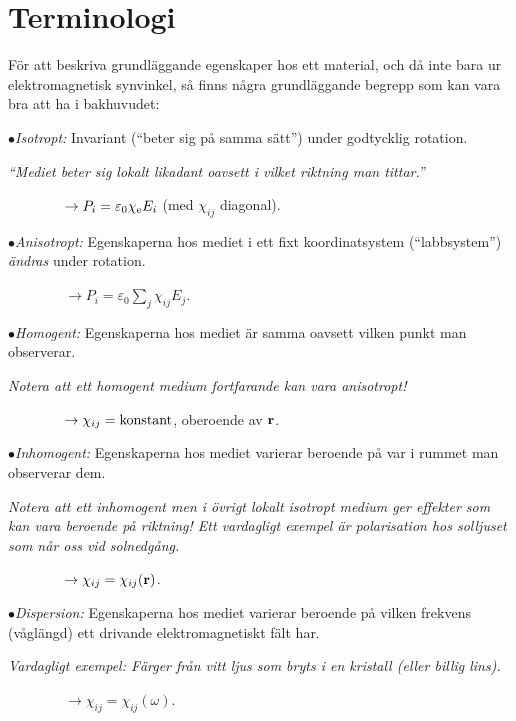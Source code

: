 {{{{\section{Terminologi}
F{\"o}r att beskriva grundl{\"a}ggande egenskaper hos ett material, och d{\aa}
inte bara ur elektromagnetisk synvinkel, s{\aa} finns n{\aa}gra
grundl{\"a}ggande begrepp som kan vara bra att ha i bakhuvudet:
\medskip
\item{$\bullet$}{{\it Isotropt:} Invariant (``beter sig p{\aa} samma s{\"a}tt'')
under godtycklig rotation.
      }
\item{}{{\it ``Mediet beter sig lokalt likadant oavsett i vilket riktning man
      tittar.''}}
\smallskip
\item{}{$\displaystyle \qquad\qquad
    \to P_i=\varepsilon_0\chi_{\rm e}E_i$\hskip20pt (med $\chi_{ij}$ diagonal).}
\smallskip
\item{$\bullet$}{{\it Anisotropt:} Egenskaperna hos mediet i ett fixt
      koordinatsystem (``labbsystem'') {\it {\"a}ndras} under rotation.
      }
\smallskip
\item{}{$\displaystyle \qquad\qquad\to P_i=\varepsilon_0\sum_{j}\chi_{ij}E_j$.}
\smallskip
\item{$\bullet$}{{\it Homogent:} Egenskaperna hos mediet {\"a}r samma oavsett
      vilken punkt man observerar.}
\item{}{{\it Notera att ett homogent medium fortfarande kan vara anisotropt!}}
\smallskip
\item{}{$\displaystyle \qquad\qquad\to \chi_{ij}=\hbox{konstant}$,
      oberoende av ${\bf r}$.}
\smallskip
\item{$\bullet$}{{\it Inhomogent:} Egenskaperna hos mediet varierar
      beroende p{\aa} var i rummet man observerar dem.}
\item{}{{\it Notera att ett inhomogent men i {\"o}vrigt lokalt isotropt
      medium ger effekter som kan vara beroende p{\aa} riktning!
      Ett vardagligt exempel {\"a}r polarisation hos solljuset som n{\aa}r
      oss vid solnedg{\aa}ng.}}
\smallskip
\item{}{$\displaystyle \qquad\qquad\to \chi_{ij}=\chi_{ij}({\bf r})$.}
\smallskip
\item{$\bullet$}{{\it Dispersion:} Egenskaperna hos mediet varierar beroende
      p{\aa} vilken frekvens (v{\aa}gl{\"a}ngd) ett drivande elektromagnetiskt
      f{\"a}lt har.}
\item{}{{\it Vardagligt exempel: F{\"a}rger fr{\aa}n vitt ljus som bryts
      i en kristall (eller billig lins).}
\smallskip
\item{}{$\displaystyle \qquad\qquad\to \chi_{ij}=\chi_{ij}(\omega)$.}
\medskip
}}}}}
